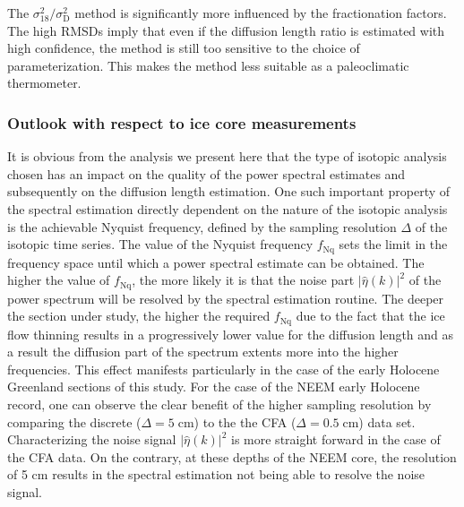 \documentclass[11pt, draftcls, onecolumn]{IEEEtran} %
\numberwithin{equation}{section}
\numberwithin{table}{section}
\numberwithin{figure}{section}
\begin{document}
The ${\sigma^2_{18}}/{\sigma^2_\mathrm{D}}$ method is significantly more influenced by the 
fractionation factors. 
The high RMSDs imply that even if the diffusion length ratio is estimated with high confidence,
the method is still too sensitive to the choice of parameterization.
This makes the method less suitable as a paleoclimatic thermometer. 



\subsubsection{Outlook with respect to ice core measurements} \label{sec:outlook}
It is obvious from the analysis we present here that the type of isotopic analysis chosen has an 
impact on the quality of the power spectral estimates and subsequently on the diffusion length estimation.
One such important property of the spectral estimation directly dependent on the nature of the isotopic analysis
is the achievable Nyquist frequency, defined by the sampling resolution $\Delta$ of the isotopic time series.
The value of the Nyquist frequency $f_{\mathrm{Nq}}$ sets the limit in the frequency space until which a power spectral estimate can be obtained.
The higher the value of  $f_{\mathrm{Nq}}$, the more likely it is that the noise part  ${\vert \hat{\eta} \left( k \right) \vert} ^{2}$ 
of the power spectrum will be resolved by the spectral estimation routine.
The deeper the section under study, the higher the required $f_{\mathrm{Nq}}$ due to the fact that the ice flow thinning
results in a progressively lower value for the diffusion length and as a result the diffusion part of the spectrum extents
more into the higher frequencies. 
This effect manifests particularly in the case of the early Holocene Greenland sections of this study.
For the case of the NEEM early Holocene record, one can observe the clear benefit of the higher sampling resolution
by comparing the discrete ($\Delta = 5 \;\mathrm{cm}$) to the the CFA ($\Delta = 0.5 \;\mathrm{cm}$) data set.
Characterizing the noise  signal ${\vert \hat{\eta} \left( k \right) \vert} ^{2}$ is more straight forward in the case of the CFA data.
On the contrary, at these depths of the NEEM core, the resolution of 5 cm results in the spectral estimation
not being able to resolve the noise signal.
\end{document}
